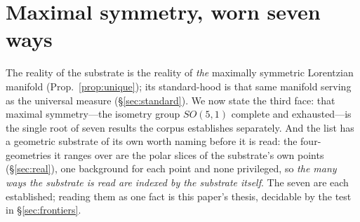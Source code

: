 \documentclass[11pt,a4paper]{article}
\theoremstyle{definition}
\begin{document}
\section{Maximal symmetry, worn seven ways}\label{sec:unification}

The reality of the substrate is the reality of \emph{the} maximally
symmetric Lorentzian manifold (Prop.~\ref{prop:unique}); its standard-hood
is that same manifold serving as the universal measure (\S\ref{sec:standard}).
We now state the third face: that maximal symmetry---the isometry group
$SO(5,1)$ complete and exhausted---is the single root of seven results the
corpus establishes separately. And the list has a geometric substrate of its own worth naming before it is read: the four-geometries it ranges over are the polar slices of the substrate's own points (\S\ref{sec:real}), one background for each point and none privileged, so \emph{the many ways the substrate is read are indexed by the substrate itself}. The seven are each established; reading them as one fact is this paper's
thesis, decidable by the test in \S\ref{sec:frontiers}.
\end{document}
